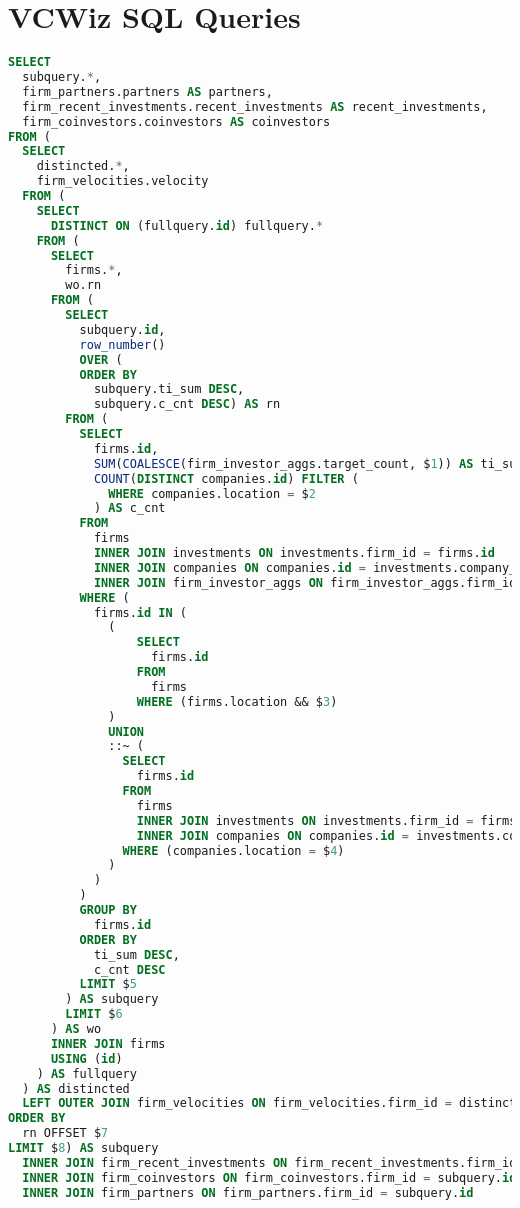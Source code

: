 \chapter{VCWiz SQL Queries}

\begin{lstlisting}[frame=single,language=SQL,basicstyle=\tiny,columns=fullflexible,label={vcwiz:sql:query},caption={Firm Filter Query}]
SELECT
  subquery.*,
  firm_partners.partners AS partners,
  firm_recent_investments.recent_investments AS recent_investments,
  firm_coinvestors.coinvestors AS coinvestors
FROM (
  SELECT
    distincted.*,
    firm_velocities.velocity
  FROM (
    SELECT
      DISTINCT ON (fullquery.id) fullquery.*
    FROM (
      SELECT
        firms.*,
        wo.rn
      FROM (
        SELECT
          subquery.id,
          row_number()
          OVER (
          ORDER BY
            subquery.ti_sum DESC,
            subquery.c_cnt DESC) AS rn
        FROM (
          SELECT
            firms.id,
            SUM(COALESCE(firm_investor_aggs.target_count, $1)) AS ti_sum,
            COUNT(DISTINCT companies.id) FILTER (
              WHERE companies.location = $2
            ) AS c_cnt
          FROM
            firms
            INNER JOIN investments ON investments.firm_id = firms.id
            INNER JOIN companies ON companies.id = investments.company_id
            INNER JOIN firm_investor_aggs ON firm_investor_aggs.firm_id = firms.id
          WHERE (
            firms.id IN (
              (
                  SELECT
                    firms.id
                  FROM
                    firms
                  WHERE (firms.location && $3)
              )
              UNION
              ::~ (
                SELECT
                  firms.id
                FROM
                  firms
                  INNER JOIN investments ON investments.firm_id = firms.id
                  INNER JOIN companies ON companies.id = investments.company_id
                WHERE (companies.location = $4)
              )
            )
          )
          GROUP BY
            firms.id
          ORDER BY
            ti_sum DESC,
            c_cnt DESC
          LIMIT $5
        ) AS subquery
        LIMIT $6
      ) AS wo
      INNER JOIN firms
      USING (id)
    ) AS fullquery
  ) AS distincted
  LEFT OUTER JOIN firm_velocities ON firm_velocities.firm_id = distincted.id
ORDER BY
  rn OFFSET $7
LIMIT $8) AS subquery
  INNER JOIN firm_recent_investments ON firm_recent_investments.firm_id = subquery.id
  INNER JOIN firm_coinvestors ON firm_coinvestors.firm_id = subquery.id
  INNER JOIN firm_partners ON firm_partners.firm_id = subquery.id
\end{lstlisting}

